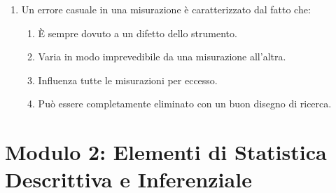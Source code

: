 \documentclass[12pt, a4paper]{article}
\begin{document}
\begin{enumerate}[resume]
    \item Un errore casuale in una misurazione è caratterizzato dal fatto che:
    \begin{enumerate}
        \item È sempre dovuto a un difetto dello strumento.
        \item Varia in modo imprevedibile da una misurazione all'altra.
        \item Influenza tutte le misurazioni per eccesso.
        \item Può essere completamente eliminato con un buon disegno di ricerca.
    \end{enumerate}
    \vspace{0.3cm}
\end{enumerate}

\section*{Modulo 2: Elementi di Statistica Descrittiva e Inferenziale}
\end{document}

